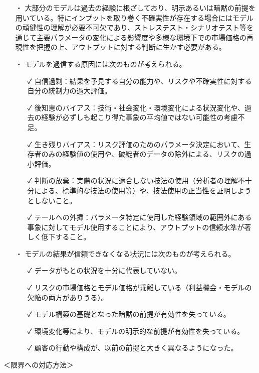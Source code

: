\documentclass[report,gutter=10mm,fore-edge=10mm,uplatex,dvipdfmx]{jlreq}
\begin{document}
\begin{itemize}
 \item [・]  大部分のモデルは過去の経験に根ざしており、明示あるいは暗黙の前提を用いている。特にインプットを取り巻く不確実性が存在する場合にはモデルの頑健性の理解が必要不可欠であり、ストレステスト・シナリオテスト等を通じて主要パラメータの変化による影響度や多様な環境下での市場価格の再現性を把握の上、アウトプットに対する判断に生かす必要がある。
 \item [・]  モデルを過信する原因には次のものが考えられる。
\begin{itemize}
 \item [✓ ] 自信過剰：結果を予見する自分の能力や、リスクや不確実性に対する自分の統制力の過大評価。
 \item [✓ ] 後知恵のバイアス：技術・社会変化・環境変化による状況変化や、過去の経験が必ずしも起こり得た事象の平均値ではない可能性の考慮不足。
 \item [✓ ] 生き残りバイアス：リスク評価のためのパラメータ決定において、生存者のみの経験値の使用や、破綻者のデータの除外による、リスクの過小評価。
 \item [✓ ] 判断の放棄：実際の状況に適合しない技法の使用（分析者の理解不十分による、標準的な技法の使用等）や、技法使用の正当性を証明しようとしないこと。
 \item [✓ ] テールへの外挿：パラメータ特定に使用した経験領域の範囲外にある事象に対してモデル使用することにより、アウトプットの信頼水準が著しく低下すること。
\end{itemize}
 \item [・]  モデルの結果が信頼できなくなる状況には次のものが考えられる。
\begin{itemize}
 \item [✓ ] データがもとの状況を十分に代表していない。
 \item [✓ ] リスクの市場価格とモデル価格が乖離している（利益機会・モデルの欠陥の両方がありうる）。
 \item [✓ ] モデル構築の基礎となった暗黙の前提が有効性を失っている。
 \item [✓ ] 環境変化等により、モデルの明示的な前提が有効性を失っている。
 \item [✓ ] 顧客の行動や構成が、以前の前提と大きく異なるようになった。
\end{itemize}
\end{itemize}

＜限界への対応方法＞
\end{document}

